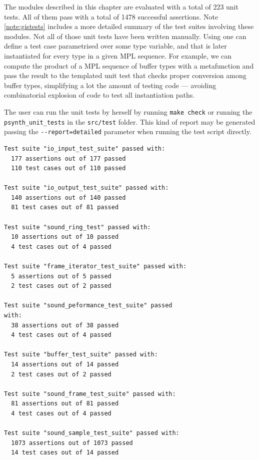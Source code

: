 The modules described in this chapter are evaluated with a total of
223 unit tests. All of them pass with a total of 1478 successful
assertions. Note \ref{note:gistests} includes a more detailed summary
of the test suites involving these modules. Not all of those unit
tests have been written manually. Using
 one can define a test case
parametrised over some type variable, and that is later instantiated
for every type in a given MPL sequence. For example, we can compute
the product of a MPL sequence of buffer types with a metafunction and
pass the result to the templated unit test that checks proper
conversion among buffer types, simplifying a lot the amount of testing
code --- avoiding combinatorial explosion of code to test all
instantiation paths.

\begin{mynote}
\label{note:gistests}
The user can run the unit tests by herself by running \texttt{make
  check} or running the \texttt{psynth\_unit\_tests} in the
\texttt{src/test} folder.  This kind of report may be generated
passing the \verb|--report=detailed| parameter when running the test
script directly.  {\small
\begin{verbatim}
Test suite "io_input_test_suite" passed with:
  177 assertions out of 177 passed
  110 test cases out of 110 passed

Test suite "io_output_test_suite" passed with:
  140 assertions out of 140 passed
  81 test cases out of 81 passed

Test suite "sound_ring_test" passed with:
  10 assertions out of 10 passed
  4 test cases out of 4 passed

Test suite "frame_iterator_test_suite" passed with:
  5 assertions out of 5 passed
  2 test cases out of 2 passed

Test suite "sound_peformance_test_suite" passed 
with:
  38 assertions out of 38 passed
  4 test cases out of 4 passed

Test suite "buffer_test_suite" passed with:
  14 assertions out of 14 passed
  2 test cases out of 2 passed

Test suite "sound_frame_test_suite" passed with:
  81 assertions out of 81 passed
  4 test cases out of 4 passed

Test suite "sound_sample_test_suite" passed with:
  1073 assertions out of 1073 passed
  14 test cases out of 14 passed
\end{verbatim}
}
\end{mynote}

